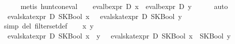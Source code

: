 \begin{isabellebody}
\ \ \ \ \isamarkupfalse%
\ {}metis\ hunt{}con{}eval{}\isanewline
\ \ \isamarkupfalse%
\ {}eval{}bexpr\ D\ x\ {}\ eval{}bexpr\ D\ y{}\isanewline
\ \ \ \ \isamarkupfalse%
\ auto\isanewline
\ \ \isamarkupfalse%
\ {}{}{}{}\ eval{}skat{}expr\ D\ {}SKBool\ x{}\ {}\ {}\ eval{}skat{}expr\ D\ {}SKBool\ y{}\ {}{}\isanewline
\ \ \ \ \isamarkupfalse%
\ {}simp\ del{}\ filter{}set{}def{}\isanewline
{}\isamarkupfalse%
\isanewline
\ \ \isamarkupfalse%
\ x\ y\ \isamarkupfalse%
\ {}{}{}{}\ eval{}skat{}expr\ D\ {}SKBool\ {}x\ {}{}{}\ y{}{}\ {}\ {}\ eval{}skat{}expr\ D\ {}SKBool\ x\ {}{}{}\ SKBool\ y{}\ {}{}\isanewline

\end{isabellebody}
